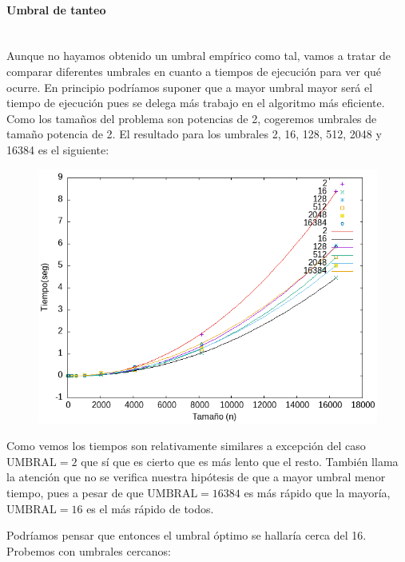\documentclass{article}
\newcommand{\myparagraph}[1]{\paragraph{#1}\mbox{}\\}
\begin{document}
    \myparagraph{Umbral de tanteo}

    Aunque no hayamos obtenido un umbral empírico como tal, vamos a tratar
    de comparar diferentes umbrales en cuanto a tiempos de ejecución para ver
    qué ocurre. En principio podríamos suponer que a mayor umbral mayor será
    el tiempo de ejecución pues se delega más trabajo en el algoritmo más eficiente.
    Como los tamaños del problema son potencias de 2, cogeremos umbrales de
    tamaño potencia de 2.
    El resultado para los umbrales 2, 16, 128, 512, 2048 y 16384 es el siguiente:
    
    \begin{figure}[H]
        \centering
        \includegraphics[scale=0.7]{P2/Salida_comparativa1.png} 
    \end{figure}

    Como vemos los tiempos son relativamente similares a excepción del caso
    $\text{UMBRAL}=2$ que sí que es cierto que es más lento que el resto. También llama la
    atención que no se verifica nuestra hipótesis de que a mayor umbral menor tiempo,
    pues a pesar de que $\text{UMBRAL}=16384$ es más rápido que la mayoría, $\text{UMBRAL}=16$
    es el más rápido de todos.

    Podríamos pensar que entonces el umbral óptimo se hallaría cerca del 16. Probemos
    con umbrales cercanos:
\end{document}
